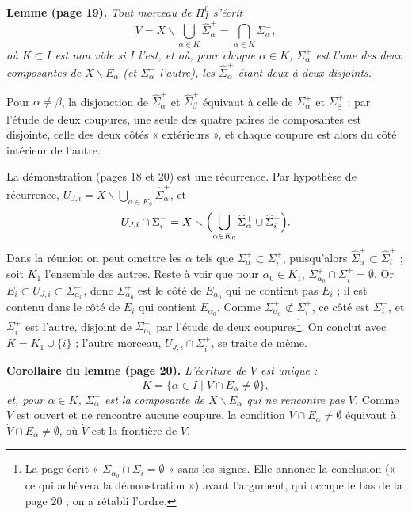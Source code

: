 \documentclass[11pt,a4paper]{article}
\begin{document}
\textbf{Lemme (page 19).} \emph{Tout morceau de $\Pi_I^0$ s'écrit}
\[
V = X \smallsetminus \bigcup_{\alpha \in K} \widehat{\Sigma}_\alpha^{+}
= \bigcap_{\alpha \in K} \Sigma_\alpha^{-},
\]
\emph{où $K \subset I$ est non vide si $I$ l'est, et où, pour chaque $\alpha
\in K$, $\Sigma_\alpha^{+}$ est l'une des deux composantes de $X
\smallsetminus E_\alpha$ (et $\Sigma_\alpha^{-}$ l'autre), les
$\widehat{\Sigma}_\alpha^{+}$ étant deux à deux disjoints.}

Pour $\alpha \neq \beta$, la disjonction de $\widehat{\Sigma}_\alpha^{+}$ et
$\widehat{\Sigma}_\beta^{+}$ équivaut à celle de $\Sigma_\alpha^{+}$ et
$\Sigma_\beta^{+}$ : par l'étude de deux coupures, une seule des quatre
paires de composantes est disjointe, celle des deux côtés « extérieurs », et
chaque coupure est alors du côté intérieur de l'autre.

La démonstration (pages 18 et 20) est une récurrence. Par hypothèse de
récurrence, $U_{J,i} = X \smallsetminus \bigcup_{\alpha \in K_0}
\widehat{\Sigma}_\alpha^{+}$, et
\[
U_{J,i} \cap \Sigma_i^{-} = X \smallsetminus \Bigl( \bigcup_{\alpha \in K_0}
\widehat{\Sigma}_\alpha^{+} \cup \widehat{\Sigma}_i^{+} \Bigr).
\]
Dans la réunion on peut omettre les $\alpha$ tels que $\Sigma_\alpha^{+}
\subset \Sigma_i^{+}$, puisqu'alors $\widehat{\Sigma}_\alpha^{+} \subset
\widehat{\Sigma}_i^{+}$ ; soit $K_1$ l'ensemble des autres. Reste à voir que
pour $\alpha_0 \in K_1$, $\Sigma_{\alpha_0}^{+} \cap \Sigma_i^{+} =
\emptyset$. Or $E_i \subset U_{J,i} \subset \Sigma_{\alpha_0}^{-}$, donc
$\Sigma_{\alpha_0}^{+}$ est le côté de $E_{\alpha_0}$ qui ne contient pas
$E_i$ ; il est contenu dans le côté de $E_i$ qui contient $E_{\alpha_0}$.
Comme $\Sigma_{\alpha_0}^{+} \not\subset \Sigma_i^{+}$, ce côté est
$\Sigma_i^{-}$, et $\Sigma_i^{+}$ est l'autre, disjoint de
$\Sigma_{\alpha_0}^{+}$ par l'étude de deux coupures\footnote{La page écrit
« $\Sigma_{\alpha_0} \cap \Sigma_i = \emptyset$ » sans les signes. Elle
annonce la conclusion (« ce qui achèvera la démonstration ») avant
l'argument, qui occupe le bas de la page 20 ; on a rétabli l'ordre.}. On
conclut avec $K = K_1 \cup \{i\}$ ; l'autre morceau, $U_{J,i} \cap
\Sigma_i^{+}$, se traite de même.

\textbf{Corollaire du lemme (page 20).} \emph{L'écriture de $V$ est unique :}
\[
K = \{ \alpha \in I \mid \overline{V} \cap E_\alpha \neq \emptyset \},
\]
\emph{et, pour $\alpha \in K$, $\Sigma_\alpha^{+}$ est la composante de $X
\smallsetminus E_\alpha$ qui ne rencontre pas $V$.} Comme $V$ est ouvert et
ne rencontre aucune coupure, la condition $\overline{V} \cap E_\alpha \neq
\emptyset$ équivaut à $\dot{V} \cap E_\alpha \neq \emptyset$, où $\dot{V}$
est la frontière de $V$.
\end{document}
